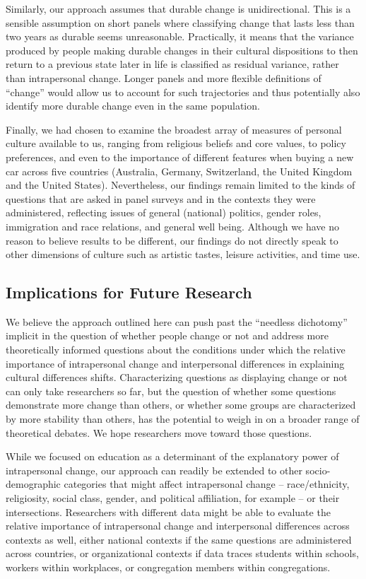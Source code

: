 \documentclass[
  12pt,
]{article}
\begin{document}
Similarly, our approach assumes that durable change is unidirectional.
This is a sensible assumption on short panels where classifying change
that lasts less than two years as durable seems unreasonable.
Practically, it means that the variance produced by people making
durable changes in their cultural dispositions to then return to a
previous state later in life is classified as residual variance, rather
than intrapersonal change. Longer panels and more flexible definitions
of ``change'' would allow us to account for such trajectories and thus
potentially also identify more durable change even in the same
population.

Finally, we had chosen to examine the broadest array of measures of
personal culture available to us, ranging from religious beliefs and
core values, to policy preferences, and even to the importance of
different features when buying a new car across five countries
(Australia, Germany, Switzerland, the United Kingdom and the United
States). Nevertheless, our findings remain limited to the kinds of
questions that are asked in panel surveys and in the contexts they were
administered, reflecting issues of general (national) politics, gender
roles, immigration and race relations, and general well being. Although
we have no reason to believe results to be different, our findings do
not directly speak to other dimensions of culture such as artistic
tastes, leisure activities, and time use.

\hypertarget{implications-for-future-research}{%
\subsection{Implications for Future
Research}\label{implications-for-future-research}}

We believe the approach outlined here can push past the ``needless
dichotomy'' implicit in the question of whether people change or not and
address more theoretically informed questions about the conditions under
which the relative importance of intrapersonal change and interpersonal
differences in explaining cultural differences shifts. Characterizing
questions as displaying change or not can only take researchers so far,
but the question of whether some questions demonstrate more change than
others, or whether some groups are characterized by more stability than
others, has the potential to weigh in on a broader range of theoretical
debates. We hope researchers move toward those questions.

While we focused on education as a determinant of the explanatory power
of intrapersonal change, our approach can readily be extended to other
socio-demographic categories that might affect intrapersonal change --
race/ethnicity, religiosity, social class, gender, and political
affiliation, for example -- or their intersections. Researchers with
different data might be able to evaluate the relative importance of
intrapersonal change and interpersonal differences across contexts as
well, either national contexts if the same questions are administered
across countries, or organizational contexts if data traces students
within schools, workers within workplaces, or congregation members
within congregations.
\end{document}
